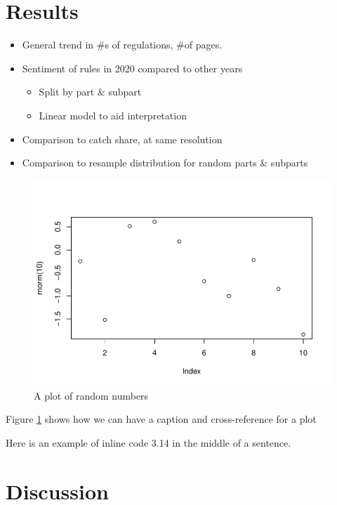\documentclass[
]{article}
\providecommand{\tightlist}{%
  \setlength{\itemsep}{0pt}\setlength{\parskip}{0pt}}
\begin{document}
\hypertarget{results}{%
\section{Results}\label{results}}

\begin{itemize}
\tightlist
\item
  General trend in \#s of regulations, \#of pages.
\item
  Sentiment of rules in 2020 compared to other years

  \begin{itemize}
  \tightlist
  \item
    Split by part \& subpart
  \item
    Linear model to aid interpretation
  \end{itemize}
\item
  Comparison to catch share, at same resolution
\item
  Comparison to resample distribution for random parts \& subparts
\end{itemize}

\begin{figure}
\centering
\includegraphics{../figures/demo-plot-1.pdf}
\caption{\label{fig:demo-plot}A plot of random numbers}
\end{figure}

Figure \ref{fig:demo-plot} shows how we can have a caption and cross-reference for a plot

Here is an example of inline code 3.14 in the middle of a sentence.

\hypertarget{discussion}{%
\section{Discussion}\label{discussion}}
\end{document}

